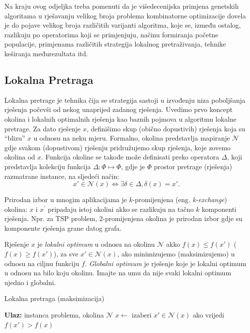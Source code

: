 \documentclass[a4paper, utf8, 11pt, colorlinks]{book}
\begin{document}
Na kraju ovog odjeljka treba pomenuti da je višedecenijska primjena genetskih algoritama u rješavanju velikog broja problema kombinatorne optimizacije dovela je do pojave velikog broja različitih varijanti algoritma, koje se, između ostalog, razlikuju po operatorima koji se primjenjuju, načinu formiranja početne populacije, primjenama različitih strategija lokalnog pretraživanja, tehnike keširanja međurezultata itd. 

 
\subsection{Lokalna Pretraga}\label{sec: local_search}

Lokalna pretrage je tehnika čija se strategija sastoji u izvođenju niza poboljšanja rješenja počevši od nekog unaprijed zadanog rješenja. Uvedimo prvo koncept okolina i lokalnih optimalnih rješenja kao baznih pojmova u algoritmu lokalne pretrage. Za dato rješenje $x$, definišimo skup (obično dopustivih) rješenja koja su ``blizu'' $x$ u odnosu na neku mjeru. Formalno, okolina predstavlja mapiranje  $\mathcal{N}$ gdje svakom (dopustivom) rješenju pridružujemo skup rješenja, koje zovemo okolina od $x$.  Funkcija okoline se takođe može definisati preko operatora  $\Delta$, koji predstavlja kolekciju   funkcija $\Delta:\Phi \mapsto \Phi$,  gdje je $\Phi$ prostor pretrage (rješenja) razmatrane instance, na sljedeći način:
$$ x' \in \mathcal{N}(x) \Longleftrightarrow \exists \delta \in \Delta,\delta(x)=x'.$$
 
Prirodan izbor u mnogim aplikacijama je $k$-promijenjena (eng. \emph{k-exchange}) okolina: $x$ i $x^{'}$ pripadaju istoj okolini akko se razlikuju na tačno $k$ komponenti rješenja. Npr. za TSP problem, 2-promijenjena okolina je prirodan izbor gdje su komponente rješenja grane datog grafa.  

  
Rješenje $x$ je \emph{lokalni optimum} u odnosu na okolinu $\mathcal{N}$ akko
$f(x) \leq f(x')$ ($f(x) \geq f(x')$), za sve $x' \in \mathcal{N}(x)$, ako minimizujemo (maksimizujemo) u odnosu na ciljnu funkciju $f$.  \emph{Globalni optimum} je rješenje koje je lokalni optimum u odnosu na bilo koju okolinu.  Imajte na umu da nije svaki lokalni optimum ujedno i globalni. 

\begin{algorithm}[!t] 
	\caption{Lokalna pretraga (maksimizacija)}\label{alg:ls}
	\begin{algorithmic}[1]
		\STATE \textbf{Ulaz:} instanca problema, okolina $\mathcal{N}$
		\STATE $ x \gets  \text{ izaberi } x' \in \mathcal{N}(x) $ ako vrijedi  $f(x') > f(x)$ 
		\ENDWHILE
	\end{algorithmic}
\end{algorithm}
\end{document}

